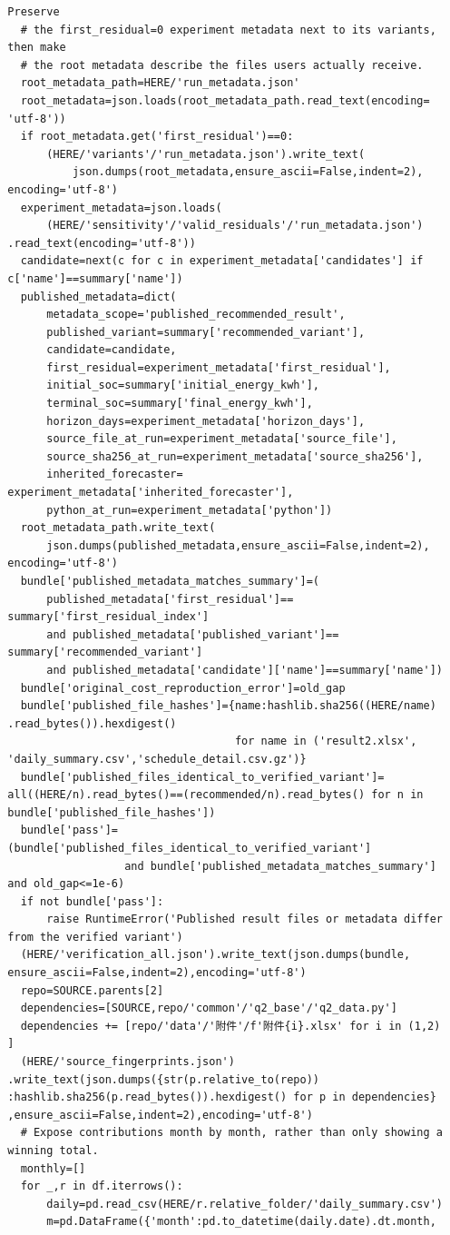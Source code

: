 \begin{verbatim}
  Preserve
    # the first_residual=0 experiment metadata next to its variants,
  then make
    # the root metadata describe the files users actually receive.
    root_metadata_path=HERE/'run_metadata.json'
    root_metadata=json.loads(root_metadata_path.read_text(encoding=
  'utf-8'))
    if root_metadata.get('first_residual')==0:
        (HERE/'variants'/'run_metadata.json').write_text(
            json.dumps(root_metadata,ensure_ascii=False,indent=2),
  encoding='utf-8')
    experiment_metadata=json.loads(
        (HERE/'sensitivity'/'valid_residuals'/'run_metadata.json')
  .read_text(encoding='utf-8'))
    candidate=next(c for c in experiment_metadata['candidates'] if
  c['name']==summary['name'])
    published_metadata=dict(
        metadata_scope='published_recommended_result',
        published_variant=summary['recommended_variant'],
        candidate=candidate,
        first_residual=experiment_metadata['first_residual'],
        initial_soc=summary['initial_energy_kwh'],
        terminal_soc=summary['final_energy_kwh'],
        horizon_days=experiment_metadata['horizon_days'],
        source_file_at_run=experiment_metadata['source_file'],
        source_sha256_at_run=experiment_metadata['source_sha256'],
        inherited_forecaster=
  experiment_metadata['inherited_forecaster'],
        python_at_run=experiment_metadata['python'])
    root_metadata_path.write_text(
        json.dumps(published_metadata,ensure_ascii=False,indent=2),
  encoding='utf-8')
    bundle['published_metadata_matches_summary']=(
        published_metadata['first_residual']==
  summary['first_residual_index']
        and published_metadata['published_variant']==
  summary['recommended_variant']
        and published_metadata['candidate']['name']==summary['name'])
    bundle['original_cost_reproduction_error']=old_gap
    bundle['published_file_hashes']={name:hashlib.sha256((HERE/name)
  .read_bytes()).hexdigest()
                                     for name in ('result2.xlsx',
  'daily_summary.csv','schedule_detail.csv.gz')}
    bundle['published_files_identical_to_verified_variant']=
  all((HERE/n).read_bytes()==(recommended/n).read_bytes() for n in
  bundle['published_file_hashes'])
    bundle['pass']=
  (bundle['published_files_identical_to_verified_variant']
                    and bundle['published_metadata_matches_summary']
  and old_gap<=1e-6)
    if not bundle['pass']:
        raise RuntimeError('Published result files or metadata differ
  from the verified variant')
    (HERE/'verification_all.json').write_text(json.dumps(bundle,
  ensure_ascii=False,indent=2),encoding='utf-8')
    repo=SOURCE.parents[2]
    dependencies=[SOURCE,repo/'common'/'q2_base'/'q2_data.py']
    dependencies += [repo/'data'/'附件'/f'附件{i}.xlsx' for i in (1,2)
  ]
    (HERE/'source_fingerprints.json')
  .write_text(json.dumps({str(p.relative_to(repo))
  :hashlib.sha256(p.read_bytes()).hexdigest() for p in dependencies}
  ,ensure_ascii=False,indent=2),encoding='utf-8')
    # Expose contributions month by month, rather than only showing a
  winning total.
    monthly=[]
    for _,r in df.iterrows():
        daily=pd.read_csv(HERE/r.relative_folder/'daily_summary.csv')
        m=pd.DataFrame({'month':pd.to_datetime(daily.date).dt.month,


\end{verbatim}
